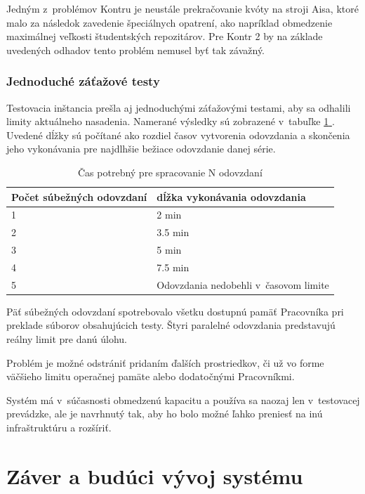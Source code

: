 \documentclass[
  digital, %
  oneside, %
  table,   %
  lof,     %
  lot,   %
]{fithesis3}
\newcommand*{\fullref}[1]{\hyperref[{#1}]{\ref*{#1} \nameref*{#1}}}
\begin{document}
Jedným z~problémov Kontru je neustále prekračovanie kvóty na stroji Aisa, ktoré malo za následok zavedenie špeciálnych opatrení, ako napríklad obmedzenie maximálnej veľkosti študentských repozitárov. Pre Kontr 2 by na základe uvedených odhadov tento problém nemusel byť tak závažný.

\subsection{Jednoduché záťažové testy}

Testovacia inštancia prešla aj jednoduchými záťažovými testami, aby sa odhalili limity aktuálneho nasadenia. Namerané výsledky sú zobrazené v~tabuľke \fullref{tab:timelimits}.
Uvedené dĺžky sú počítané ako rozdiel časov vytvorenia odovzdania a skončenia jeho vykonávania pre najdlhšie bežiace odovzdanie danej série.

\begin{table}[h]
\begin{tabular}{l l}
Počet súbežných odovzdaní & dĺžka vykonávania odovzdania  \\ [0.5ex] 
\hline
1 &  2 min  \\
2 & 3.5 min  \\
3 & 5 min \\
4 & 7.5 min \\  
5 & Odovzdania nedobehli v~časovom limite \\
\end{tabular}
\caption{Čas potrebný pre spracovanie N odovzdaní} \label{tab:timelimits}

\end{table}

Päť súbežných odovzdaní spotrebovalo všetku dostupnú pamäť Pracovníka pri preklade súborov obsahujúcich testy. Štyri paralelné odovzdania predstavujú reálny limit pre danú úlohu. 

Problém je možné odstrániť pridaním ďalších prostriedkov, či už vo forme väčšieho limitu operačnej pamäte alebo dodatočnými Pracovníkmi.

Systém má v~súčasnosti obmedzenú kapacitu a používa sa naozaj len v~testovacej prevádzke, ale je navrhnutý tak, aby ho bolo možné ľahko preniesť na inú infraštruktúru a rozšíriť.

\chapter{Záver a budúci vývoj systému}
\end{document}

